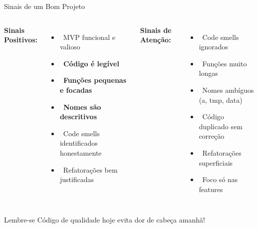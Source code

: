 \documentclass[10pt]{beamer}
\begin{document}
\begin{frame}{Sinais de um Bom Projeto}
\begin{columns}[c]
\textbf{Sinais Positivos:}
\begin{itemize}
    \item \checkmark\ MVP funcional e valioso
    \item \checkmark\ \textbf{Código é legível}
    \item \checkmark\ \textbf{Funções pequenas e focadas}
    \item \checkmark\ \textbf{Nomes são descritivos}
    \item \checkmark\ Code smells identificados honestamente
    \item \checkmark\ Refatorações bem justificadas
\end{itemize}

\textbf{Sinais de Atenção:}
\begin{itemize}
    \item {}\ Code smells ignorados
    \item {}\ Funções muito longas
    \item {}\ Nomes ambíguos (a, tmp, data)
    \item {}\ Código duplicado sem correção
    \item {}\ Refatorações superficiais
    \item {}\ Foco só nas features
\end{itemize}
\end{columns}

\vspace{0.5cm}
\begin{alertblock}{Lembre-se}
Código de qualidade hoje evita dor de cabeça amanhã!
\end{alertblock}
\end{frame}
\end{document}
